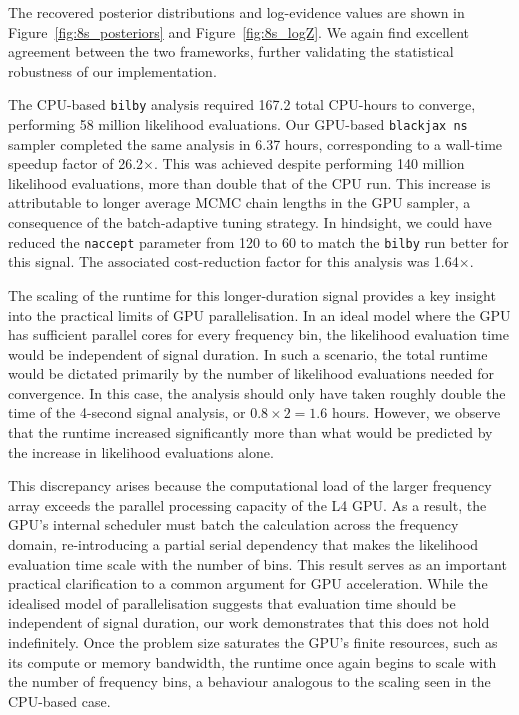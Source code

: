 \documentclass[fleqn,usenatbib]{mnras}
\begin{document}
The recovered posterior distributions and log-evidence values are shown
in Figure~\ref{fig:8s_posteriors} and Figure~\ref{fig:8s_logZ}. We again
find excellent agreement between the two frameworks, further validating
the statistical robustness of our implementation.

The CPU-based \texttt{bilby} analysis required 167.2 total CPU-hours to
converge, performing 58 million likelihood evaluations. Our GPU-based
\texttt{blackjax ns} sampler completed the same analysis in 6.37 hours,
corresponding to a wall-time speedup factor of 26.2$\times$. This was
achieved despite performing 140 million likelihood evaluations, more than
double that of the CPU run. This increase is attributable to longer average
MCMC chain lengths in the GPU sampler, a consequence of the
batch-adaptive tuning strategy. In hindsight, we could have reduced the
\texttt{naccept} parameter from 120 to 60 to match the \texttt{bilby} run better for
this signal.
The associated cost-reduction factor for this
analysis was 1.64$\times$.

The scaling of the runtime for this longer-duration signal provides a
key insight into the practical limits of GPU parallelisation. In an
ideal model where the GPU has sufficient parallel cores for every
frequency bin, the likelihood evaluation time would be independent of
signal duration. In such a scenario, the total runtime would be dictated
primarily by the number of likelihood evaluations needed for convergence.
In this case, the analysis should only have taken roughly double the time
of the 4-second signal analysis, or $0.8 \times 2 = 1.6$ hours. 
However, we observe that the runtime increased significantly more than
what would be predicted by the increase in likelihood evaluations alone.


This discrepancy arises because the computational load of the larger
frequency array exceeds the parallel processing capacity of the L4 GPU.
As a result, the GPU's internal scheduler must batch the calculation
across the frequency domain, re-introducing a partial serial dependency
that makes the likelihood evaluation time scale with the number of bins.
This result serves as an important practical clarification to a common
argument for GPU acceleration. While the idealised model of
parallelisation suggests that evaluation time should be independent of
signal duration, our work demonstrates that this does not hold
indefinitely. Once the problem size saturates the GPU's finite
resources, such as its compute or memory bandwidth, the runtime once
again begins to scale with the number of frequency bins, a behaviour
analogous to the scaling seen in the CPU-based case.
\end{document}
